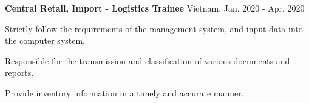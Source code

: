 \begin{cventries}
  \cvsimpleentry
    {\textbf{Central Retail, Import - Logistics Trainee}} %
    {Vietnam, Jan. 2020 - Apr. 2020} %
    {
      \begin{cvitems} %
        \item {Strictly follow the requirements of the management system, and input data into the computer system.}
        \item {Responsible for the transmission and classification of various documents and reports.}
        \item {Provide inventory information in a timely and accurate manner.}
      \end{cvitems}
    }

\end{cventries}
